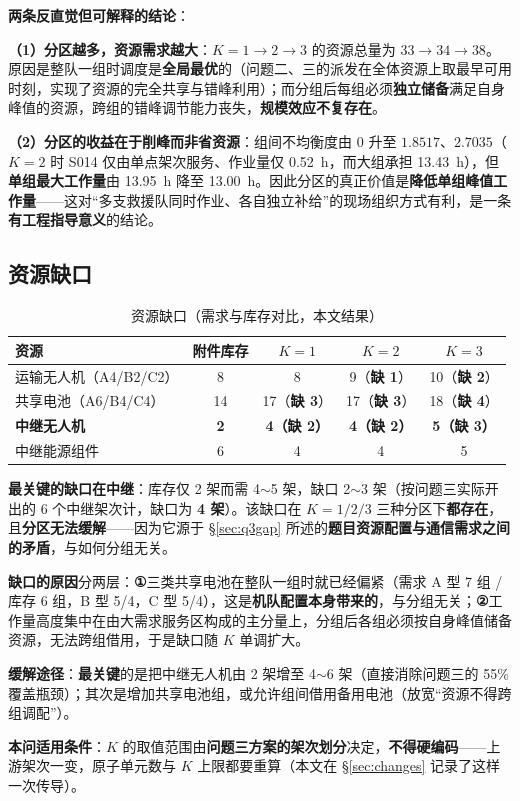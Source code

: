 \textbf{两条反直觉但可解释的结论}：

\textbf{（1）分区越多，资源需求越大}：$K=1\to2\to3$ 的资源总量为 $33\to34\to38$。原因是整队一组时调度是\textbf{全局最优}的（问题二、三的派发在全体资源上取最早可用时刻，实现了资源的完全共享与错峰利用）；而分组后每组必须\textbf{独立储备}满足自身峰值的资源，跨组的错峰调节能力丧失，\textbf{规模效应不复存在}。

\textbf{（2）分区的收益在于削峰而非省资源}：组间不均衡度由 $0$ 升至 $1.8517$、$2.7035$（$K=2$ 时 S014 仅由单点架次服务、作业量仅 \SI{0.52}{h}，而大组承担 \SI{13.43}{h}），但\textbf{单组最大工作量}由 \SI{13.95}{h} 降至 \SI{13.00}{h}。因此分区的真正价值是\textbf{降低单组峰值工作量}——这对“多支救援队同时作业、各自独立补给”的现场组织方式有利，是一条\textbf{有工程指导意义}的结论。

\subsection{资源缺口}

\begin{table}[htbp]
	\caption{资源缺口（需求与库存对比，本文结果）}
	\label{tab:q4gap}
	\centering
	\begin{tabular}{lcccc}
		\toprule
		资源 & 附件库存 & $K=1$ & $K=2$ & $K=3$ \\
		\midrule
		运输无人机（A4/B2/C2） & 8  & 8          & 9（\textbf{缺 1}）  & 10（\textbf{缺 2}） \\
		共享电池（A6/B4/C4）   & 14 & 17（\textbf{缺 3}） & 17（\textbf{缺 3}） & 18（\textbf{缺 4}） \\
		\textbf{中继无人机}    & \textbf{2} & \textbf{4（缺 2）} & \textbf{4（缺 2）} & \textbf{5（缺 3）} \\
		中继能源组件           & 6  & 4          & 4          & 5 \\
		\bottomrule
	\end{tabular}
\end{table}

\textbf{最关键的缺口在中继}：库存仅 2 架而需 4$\sim$5 架，缺口 2$\sim$3 架（按问题三实际开出的 6 个中继架次计，缺口为 \textbf{4 架}）。该缺口在 $K=1/2/3$ 三种分区下\textbf{都存在}，且\textbf{分区无法缓解}——因为它源于 \S\ref{sec:q3gap} 所述的\textbf{题目资源配置与通信需求之间的矛盾}，与如何分组无关。

\textbf{缺口的原因}分两层：\textbf{①}三类共享电池在整队一组时就已经偏紧（需求 A 型 7 组 / 库存 6 组，B 型 5/4，C 型 5/4），这是\textbf{机队配置本身带来的}，与分组无关；\textbf{②}工作量高度集中在由大需求服务区构成的主分量上，分组后各组必须按自身峰值储备资源，无法跨组借用，于是缺口随 $K$ 单调扩大。

\textbf{缓解途径}：\textbf{最关键}的是把中继无人机由 2 架增至 4$\sim$6 架（直接消除问题三的 55\% 覆盖瓶颈）；其次是增加共享电池组，或允许组间借用备用电池（放宽“资源不得跨组调配”）。

\textbf{本问适用条件}：$K$ 的取值范围由\textbf{问题三方案的架次划分}决定，\textbf{不得硬编码}——上游架次一变，原子单元数与 $K$ 上限都要重算（本文在 \S\ref{sec:changes} 记录了这样一次传导）。
